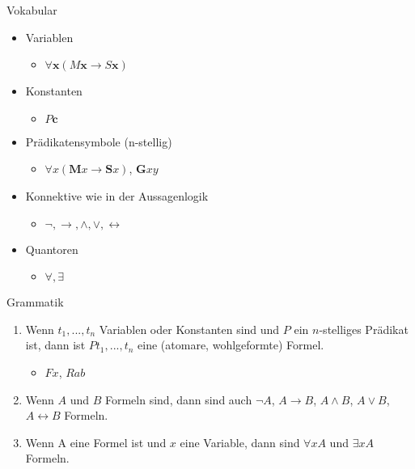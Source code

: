\documentclass[12pt]{beamer}
\begin{document}
\begin{frame}{Vokabular}
  \begin{itemize}
  \item<1-> Variablen
    \begin{itemize}
    \item $\forall \mathbf{x} (M\mathbf{x} \to S\mathbf{x})$
    \end{itemize}
  \item<2-> Konstanten
    \begin{itemize}
    \item $P\mathbf{c}$
    \end{itemize}
  \item<3-> Prädikatensymbole (n-stellig)
    \begin{itemize}
    \item $\forall x (\mathbf{M}x \to \mathbf{S}x)$, $\mathbf{G}xy$
    \end{itemize}
  \item<4-> Konnektive wie in der Aussagenlogik
    \begin{itemize}
    \item $\neg, \to, \land, \lor, \leftrightarrow$
    \end{itemize}
  \item<5-> Quantoren
    \begin{itemize}
    \item $\forall, \exists$
    \end{itemize}
  \end{itemize}
\end{frame}


\begin{frame}{Grammatik}
  \begin{enumerate}
  \item<1-> Wenn $t_1,...,t_n$ Variablen oder Konstanten sind und $P$
    ein $n$-stelliges Prädikat ist, dann ist $Pt_1,...,t_n$ eine
    (atomare, wohlgeformte) Formel.
    \begin{itemize}
    \item<2-> $Fx$, $Rab$
    \end{itemize}
  \item<3-> Wenn $A$ und $B$ Formeln sind, dann sind auch $\neg A$,
    $A\to B$, $A \land B$, $A \lor B$, $A \leftrightarrow B$ Formeln.
  \item<4-> Wenn A eine Formel ist und $x$ eine Variable, dann sind
    $\forall xA$ und $\exists x A$ Formeln.
  \end{enumerate}
\end{frame}
\end{document}
